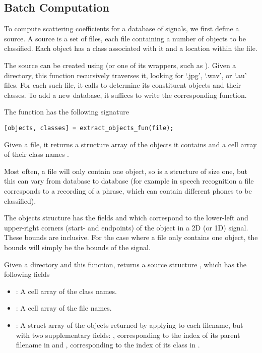\documentclass[twocolumn]{article}
\begin{document}
\subsection{Batch Computation}

To compute scattering coefficients for a database of signals, we first define a source. A source is a set of files, each file containing a number of objects to be classified. Each object has a class associated with it and a location within the file.

The source can be created using  (or one of its wrappers, such as ). Given a directory, this function recursively traverses it, looking for `.jpg', `.wav', or `.au' files. For each such file, it calls  to determine its constituent objects and their classes. To add a new database, it suffices to write the corresponding  function.

The  function has the following signature
\begin{lstlisting}
[objects, classes] = extract_objects_fun(file);
\end{lstlisting}
Given a file, it returns a structure array  of the objects it contains and a cell array of their class names . 

Most often, a file will only contain one object, so  is a  structure of size one, but this can vary from database to database (for example in speech recognition a file corresponds to a recording of a phrase, which can contain different phones to be classified).

The objects structure has the fields  and  which correspond to the lower-left and upper-right corners (start- and endpoints) of the object in a 2D (or 1D) signal. These bounds are inclusive. For the case where a file only contains one object, the bounds will simply be the bounds of the signal.

Given a directory and this function,  returns a source structure , which has the following fields
\begin{itemize}
	\item {}: A cell array of the class names.
	\item {}: A cell array of the file names.
	\item {}: A struct array of the objects returned by applying  to each filename, but with two supplementary fields: , corresponding to the index of its parent filename in  and , corresponding to the index of its class in .
\end{itemize}
\end{document}
